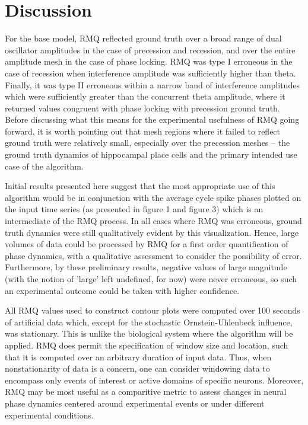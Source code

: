 \documentclass[12pt, letterpaper]{article}
\newenvironment{collapsable}{}{}
\begin{document}
\begin{collapsable}
  \section*{\normalfont\normalsize\bf Discussion}
  For the base model, RMQ reflected ground truth over a broad range of dual
  oscillator amplitudes in the case of precession and recession, and over the
  entire amplitude mesh in the case of phase locking. RMQ was type I erroneous
  in the case of recession when interference amplitude was sufficiently higher
  than theta. Finally, it was type II erroneous within a narrow band of
  interference amplitudes which were sufficiently greater than the concurrent
  theta amplitude, where it returned values congruent with phase locking with
  precession ground truth. Before discussing what this means for the
  experimental usefulness of RMQ going forward, it is worth pointing out that
  mesh regions where it failed to reflect ground truth were relatively small,
  especially over the precession meshes -- the ground truth dynamics of
  hippocampal place cells and the primary intended use case of the algorithm.

  \vspace{12pt}

  Initial results presented here suggest that the most appropriate use of this
  algorithm would be in conjunction with the average cycle spike phases plotted
  on the input time series (as presented in figure 1 and figure 3) which is an intermediate of
  the RMQ process. In all cases where RMQ was erroneous, ground truth dynamics
  were still qualitatively evident by this visualization. Hence, large
  volumes of data could be processed by RMQ for a first order quantification of
  phase dynamics, with a qualitative assessment to consider the possibility of
  error. Furthermore, by these preliminary results, negative values of large
  magnitude (with the notion of 'large' left undefined, for now) were never
  erroneous, so such an experimental outcome could be taken with higher
  confidence.

  \vspace{12pt}

  All RMQ values used to construct contour plots were computed over 100 seconds
  of artificial data which, except for the stochastic Ornstein-Uhlenbeck
  influence, was stationary. This is unlike the biological system where the
  algorithm will be applied. RMQ does permit the specification of window size
  and location, such that it is computed over an arbitrary duration of input
  data. Thus, when nonstationarity of data is a concern, one can consider
  windowing data to encompass only events of interest or active domains of
  specific neurons. Moreover, RMQ may be most useful as a comparitive metric to
  assess changes in neural phase dynamics centered around experimental events or
  under different experimental conditions.


\end{collapsable}
\end{document}
